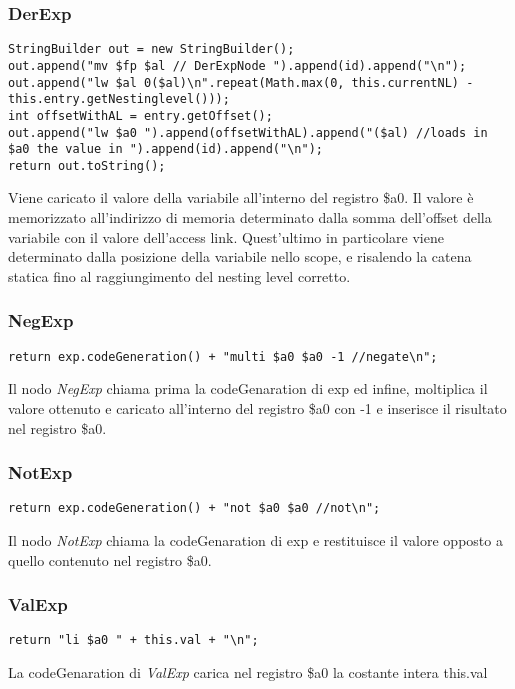 \documentclass[12pt,twoside,openright,a4paper]{report}
\begin{document}
\newpage
\subsubsection{DerExp}
\begin{lstlisting}
StringBuilder out = new StringBuilder();
out.append("mv $fp $al // DerExpNode ").append(id).append("\n");
out.append("lw $al 0($al)\n".repeat(Math.max(0, this.currentNL) - this.entry.getNestinglevel()));
int offsetWithAL = entry.getOffset();
out.append("lw $a0 ").append(offsetWithAL).append("($al) //loads in $a0 the value in ").append(id).append("\n");
return out.toString();
\end{lstlisting}
Viene caricato il valore della variabile all'interno del registro \$a0. Il valore è memorizzato all'indirizzo di memoria determinato dalla somma dell'offset della variabile con il valore dell'access link. Quest'ultimo in particolare viene determinato dalla posizione della variabile nello scope, e risalendo la catena statica fino al raggiungimento del nesting level corretto.


\subsubsection{NegExp}
\begin{lstlisting}
return exp.codeGeneration() + "multi $a0 $a0 -1 //negate\n";
\end{lstlisting}
Il nodo \textit{NegExp} chiama prima la codeGenaration di exp ed infine, moltiplica il valore ottenuto e caricato all'interno del registro \$a0 con -1 e inserisce il risultato nel registro \$a0.

\subsubsection{NotExp}
\begin{lstlisting}
return exp.codeGeneration() + "not $a0 $a0 //not\n";
\end{lstlisting}
Il nodo \textit{NotExp} chiama la codeGenaration di exp e restituisce il valore opposto a quello contenuto nel registro \$a0.

\subsubsection{ValExp}
\begin{lstlisting}
return "li $a0 " + this.val + "\n";
\end{lstlisting}
La codeGenaration di \textit{ValExp} carica nel registro \$a0 la costante intera this.val
\end{document}
